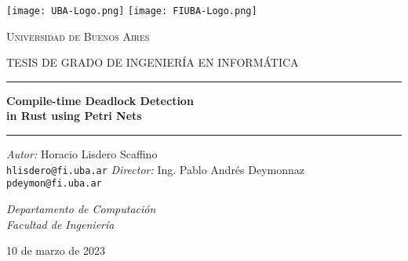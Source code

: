 
\begin{titlepage}
    \centering
    \Large

    \texttt{[image: UBA-Logo.png]}
    \hfill
    \texttt{[image: FIUBA-Logo.png]}

    {\Huge \textsc{Universidad de Buenos Aires} \par}
    {\large \textsc{\uppercase{Tesis de grado de Ingeniería en Informática}}}

    \rule{\linewidth}{0.5mm}
    {\Huge \textbf{Compile-time Deadlock Detection}
        \\ \textbf{in Rust using Petri Nets}}
    \rule{\linewidth}{0.5mm}

    \vfill
    \textit{Autor:} Horacio Lisdero Scaffino\\
    {\large \texttt{hlisdero@fi.uba.ar}}
    \vfill
    \textit{Director:} Ing. Pablo Andrés Deymonnaz\\
    {\large \texttt{pdeymon@fi.uba.ar}}

    \vfill
    \textit{Departamento de Computación}\\
    \textit{Facultad de Ingeniería}
    \vfill

    10 de marzo de 2023
\end{titlepage}
